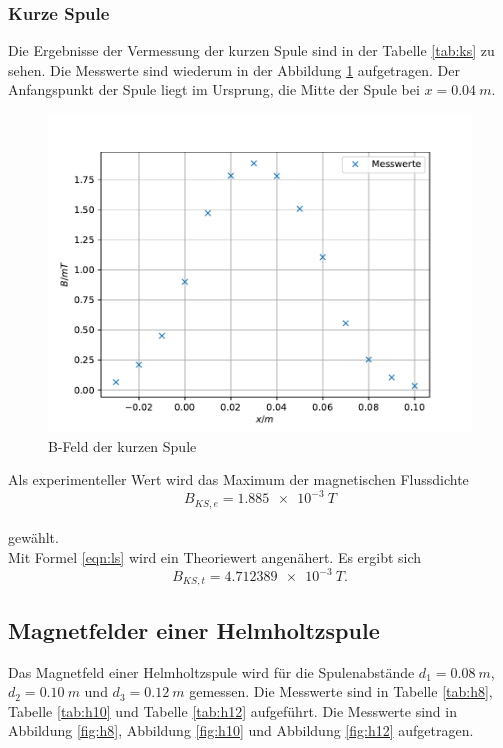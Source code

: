 \subsubsection{Kurze Spule}
Die Ergebnisse der Vermessung der kurzen Spule sind in der Tabelle \ref{tab:ks} zu sehen.
Die Messwerte sind wiederum in der Abbildung \ref{fig:ks} aufgetragen.
Der Anfangspunkt der Spule liegt im Ursprung, die Mitte der Spule bei $x=\SI{0.04}{m}$.

\begin{figure}[h!]
  \centering
  \includegraphics[width=\textwidth]{Kurzesp.pdf}
  \caption{B-Feld der kurzen Spule}
  \label{fig:ks}
\end{figure}
Als experimenteller Wert wird das Maximum der magnetischen Flussdichte
\begin{equation*}
  B_{KS, e} = \SI{1.885e-3}{T}
\end{equation*}
\\gewählt.
\\Mit Formel \eqref{eqn:ls} wird ein Theoriewert angenähert.
Es ergibt sich
\begin{equation*}
  B_{KS, t} = \SI{4.712389e-3}{T}.
\end{equation*}
\FloatBarrier

\subsection{Magnetfelder einer Helmholtzspule}
Das Magnetfeld einer Helmholtzspule wird für die Spulenabstände $d_{1}=\SI{0.08}{m}$, $d_{2}=\SI{0.10}{m}$ und $d_{3}=\SI{0.12}{m}$ gemessen.
Die Messwerte sind in Tabelle \ref{tab:h8}, Tabelle \ref{tab:h10} und Tabelle \ref{tab:h12} aufgeführt.
Die Messwerte sind in Abbildung \ref{fig:h8}, Abbildung \ref{fig:h10} und Abbildung \ref{fig:h12} aufgetragen.

